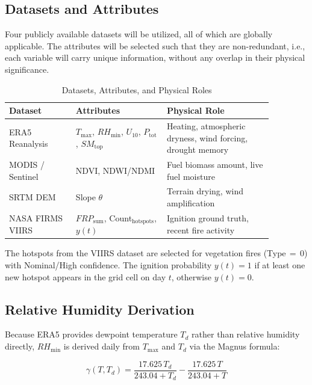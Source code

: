 \documentclass[conference]{IEEEtran}
\begin{document}
\subsection{Datasets and Attributes}

Four publicly available datasets will be utilized, all of which are globally applicable. The attributes will be selected such that they are non-redundant, i.e., each variable will carry unique information, without any overlap in their physical significance.

\begin{table}[h]
\caption{Datasets, Attributes, and Physical Roles}
\label{tab:datasets}
\centering
\small
\begin{tabular}{|p{0.22\linewidth}|p{0.3\linewidth}|p{0.35\linewidth}|}
\hline
\textbf{Dataset} & \textbf{Attributes} & \textbf{Physical Role} \\
\hline
ERA5 Reanalysis &
$T_{\max}$, $\mathit{RH}_{\min}$, $U_{10}$, $P_{\mathrm{tot}}$, $\mathit{SM}_{\mathrm{top}}$ &
Heating, atmospheric dryness, wind forcing, drought memory \\
\hline
MODIS / Sentinel &
NDVI, NDWI/NDMI &
Fuel biomass amount, live fuel moisture \\
\hline
SRTM DEM &
Slope $\theta$ &
Terrain drying, wind amplification \\
\hline
NASA FIRMS VIIRS &
$\mathit{FRP}_{\mathrm{sum}}$, Count$_{\mathrm{hotspots}}$, $y(t)$ &
Ignition ground truth, recent fire activity \\
\hline
\end{tabular}
\end{table}

The hotspots from the VIIRS dataset are selected for vegetation fires (Type\,$=$\,0) with Nominal/High confidence. The ignition probability $y(t) = 1$ if at least one new hotspot appears in the grid cell on day $t$, otherwise $y(t) = 0$.

\subsection{Relative Humidity Derivation}

Because ERA5 provides dewpoint temperature $T_d$ rather than relative humidity
directly, $\mathit{RH}_{\min}$ is derived daily from $T_{\max}$ and $T_d$ via the
Magnus formula:

\begin{equation}
\gamma(T, T_d) = \frac{17.625\,T_d}{243.04 + T_d} - \frac{17.625\,T}{243.04 + T}
\end{equation}
\end{document}
